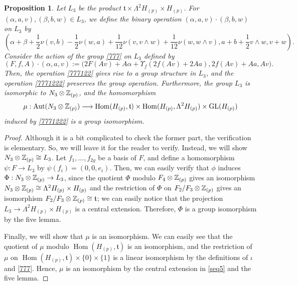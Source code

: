\documentclass{article}
\theoremstyle{plain}
\newtheorem{prop}[thm]{Proposition}
\theoremstyle{definition}
\def\Hom{\mathop{\mathrm{Hom}}\nolimits}
\newcommand{\lra}{\longrightarrow}
\newcommand{\ra}{\rightarrow}
\newcommand{\Z}{{\Bbb Z}}
\newcommand{\Aut}{{\rm Aut}}
\newcommand{\GL}{{\rm GL}}
\begin{document}
{\begin{prop}\label{7787}
Let $L_3 $ be the product $\mathfrak{t} \times \Lambda^2 H_{(p)} \times H_{(p)} $. For $(\alpha, a, v), (\beta,b,w) \in L_3$, we define the binary operation $(\alpha, a, v) \cdot (\beta,b,w)$ on $L_3$ by
\begin{equation}\label{777122}
( \alpha + \beta +
\frac{1}{2}\nu( v,b) -\frac{1}{2}\nu(w,a)+ \frac{1}{12} \nu( v,v \wedge w) +\frac{1}{12} \nu( w,w \wedge v), a+b + \frac{1}{2} v \wedge w, v+w).
\end{equation}
Consider the action of the group \eqref{777} on $L_3$ defined by
\begin{equation}\label{7771222}
(F,f, A) \cdot (\alpha, a, v) :=
\bigl(2F(Av)+A \alpha + \Upsilon_{f}( 2f(Av) + 2Aa) , 2f(Av)+Aa ,Av \bigr).
\end{equation}
Then, the operation \eqref{777122} gives rise to a group structure in $L_3$, and the operation \eqref{7771222} preserves the group operation. Furthermore, the group $L_3$ is isomorphic to $N_3 \otimes\Z_{(p)} $, and the homomorphism
\[\mu : \Aut( N_3 \otimes \Z_{(p)}) \lra \Hom( H_{(p)}, \mathfrak{t} ) \times \Hom( H_{(p)}, \Lambda^2 H_{(p)}) \times \GL(H_{(p)}) \]
induced by \eqref{7771222} is a group isomorphism.
\end{prop}

\begin{proof}
Although it is a bit complicated to check the former part, the verification is elementary. So, we will leave it for the reader to verify. Instead, we will show $ N_3 \otimes \Z_{(p)} \cong L_3$. Let $f_1, \dots, f_{2g}$ be a basis of $F$, and define a homomorphism $\psi: F \ra L_3 $ by $\psi(f_i) =(0,0,e_i)$. Then, we can easily verify that $\phi$ induces $\Phi: N_3 \otimes \Z_{(p)} \ra L_3 $, since the quotient $ \Phi $ modulo $F_4 \otimes \Z_{(p)} $ gives an isomorphism $N_3 \otimes\Z_{(p)} \cong \Lambda^2 H_{(p)} \times H_{(p)}$ and the restriction of $\Phi $ on $ F_2/F_3 \otimes \Z_{(p)}$ gives an isomorphism $F_2/F_3 \otimes \Z_{(p)} \cong \mathfrak{t}$; we can easily notice that the projection $L_3 \ra \Lambda^2 H_{(p)} \times H_{(p)}$ is a central extension. Therefore, $\Phi$ is a group isomorphism by the five lemma.

Finally, we will show that $\mu $ is an isomorphism. We can easily see that the quotient of $ \mu$ modulo $ \Hom( H_{(p)}, \mathfrak{t} )$ is an isomorphism, and the restriction of $\mu $ on $\Hom( H_{(p)}, \mathfrak{t} ) \times \{0\} \times \{1\} $ is a linear isomorphism by the definitions of $ \iota $ and \eqref{777}. Hence, $\mu$ is an isomorphism by the central extension in \eqref{seq5} and the five lemma.
\end{proof}

}
\end{document}
